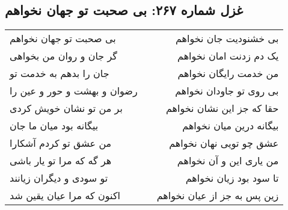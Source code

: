 \begin{center}
\section*{غزل شماره ۲۶۷: بی صحبت تو جهان نخواهم}
\label{sec:267}
\begin{longtable}{l p{0.5cm} r}
بی صحبت تو جهان نخواهم
&&
بی خشنودیت جان نخواهم
\\
گر جان و روان من بخواهی
&&
یک دم زدنت امان نخواهم
\\
جان را بدهم به خدمت تو
&&
من خدمت رایگان نخواهم
\\
رضوان و بهشت و حور و عین را
&&
بی روی تو جاودان نخواهم
\\
بر من تو نشان خویش کردی
&&
حقا که جز این نشان نخواهم
\\
بیگانه بود میان ما جان
&&
بیگانه درین میان نخواهم
\\
من عشق تو کردم آشکارا
&&
عشق چو تویی نهان نخواهم
\\
هر گه که مرا تو یار باشی
&&
من یاری این و آن نخواهم
\\
تو سودی و دیگران زیانند
&&
تا سود بود زیان نخواهم
\\
اکنون که مرا عیان یقین شد
&&
زین پس به جز از عیان نخواهم
\\
\end{longtable}
\end{center}
